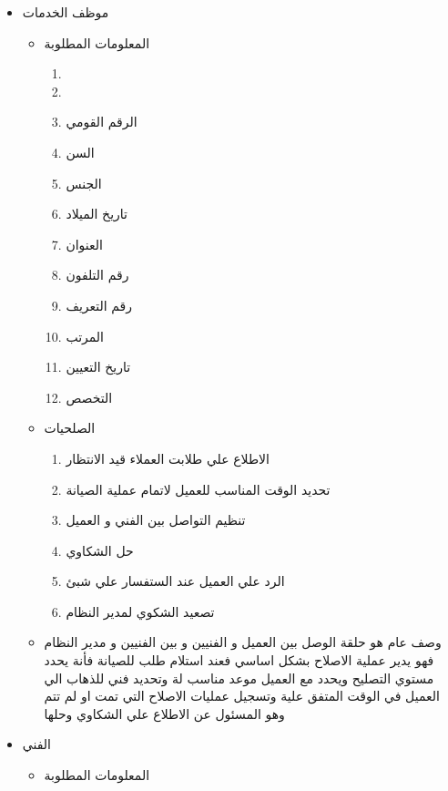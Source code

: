 \documentclass[25pt]{article}
\begin{document}
\begin{itemize}
		\item موظف الخدمات
		\begin{itemize}
			\item المعلومات المطلوبة
			\begin{enumerate}
				\item{}
				\item{}
				\item الرقم القومي
				\item السن
				\item الجنس
				\item تاريخ الميلاد
				\item العنوان 
				\item رقم التلفون
				\item رقم التعريف 
				\item المرتب
				\item تاريخ التعيين 
				\item التخصص
			\end{enumerate}
			\item الصلحيات
			\begin{enumerate}
				\item الاطلاع علي طلابت  العملاء قيد الانتظار
				\item تحديد الوقت المناسب للعميل لاتمام عملية الصيانة
				\item تنظيم التواصل بين الفني و العميل
				\item حل الشكاوي 
				\item الرد علي العميل عند الستفسار علي شبئ
				\item تصعيد الشكوي لمدير النظام  
				\newline
			\end{enumerate}
			\item وصف عام 
			\newline
هو حلقة الوصل بين العميل و الفنيين و بين الفنيين و مدير النظام فهو يدير عملية الاصلاح بشكل اساسي فعند استلام طلب للصيانة فأنة يحدد مستوي التصليح ويحدد مع العميل موعد مناسب لة وتحديد فني للذهاب الي العميل في الوقت المتفق علية وتسجيل عمليات الاصلاح التي تمت او لم تتم وهو المسئول عن الاطلاع علي الشكاوي وحلها
			\newline
			\newline
		\end{itemize}
		\item الفني
		\begin{itemize}
			\item المعلومات المطلوبة
			\begin{enumerate}

\end{enumerate}
\end{itemize}
\end{itemize}
\end{document}
